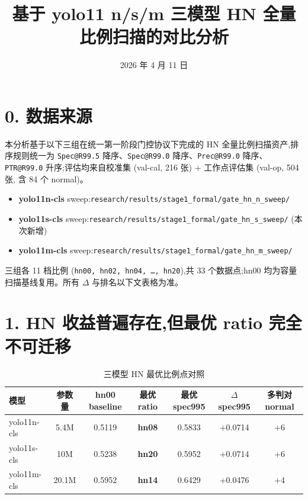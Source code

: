 \documentclass[UTF8,12pt,a4paper]{ctexart}
\title{基于 yolo11 n/s/m 三模型 HN 全量比例扫描的对比分析}
\author{}
\date{2026 年 4 月 11 日}
\begin{document}
\maketitle

\section*{0. 数据来源}

本分析基于以下三组在统一第一阶段门控协议下完成的 HN 全量比例扫描资产,排序规则统一为 \texttt{Spec@R99.5} 降序、\texttt{Spec@R99.0} 降序、\texttt{Prec@R99.0} 降序、\texttt{PTR@R99.0} 升序;评估均来自校准集 (val-cal, 216 张) + 工作点评估集 (val-op, 504 张, 含 84 个 normal)。

\begin{itemize}[leftmargin=*,itemsep=2pt]
    \item \textbf{yolo11n-cls} sweep:\texttt{research/results/stage1\_formal/gate\_hn\_n\_sweep/}
    \item \textbf{yolo11s-cls} sweep:\texttt{research/results/stage1\_formal/gate\_hn\_s\_sweep/} (本次新增)
    \item \textbf{yolo11m-cls} sweep:\texttt{research/results/stage1\_formal/gate\_hn\_m\_sweep/}
\end{itemize}

\noindent 三组各 11 档比例 (\texttt{hn00, hn02, hn04, \ldots, hn20}),共 33 个数据点;hn00 均为容量扫描基线复用。所有 \(\Delta\) 与排名以下文表格为准。

\bigskip
\section*{1. HN 收益普遍存在,但最优 ratio 完全不可迁移}

\begin{table}[h]
\centering
\caption{三模型 HN 最优比例点对照}
\begin{tabular}{lcccccc}
\toprule
模型 & 参数量 & hn00 baseline & 最优 ratio & 最优 spec995 & \(\Delta\)spec995 & 多判对 normal \\
\midrule
yolo11n-cls & 5.4M  & 0.5119 & \textbf{hn08} & 0.5833 & +0.0714 & +6 \\
yolo11s-cls & 10M   & 0.5238 & \textbf{hn20} & 0.5952 & +0.0714 & +6 \\
yolo11m-cls & 20.1M & 0.5952 & \textbf{hn14} & 0.6429 & +0.0476 & +4 \\
\bottomrule
\end{tabular}
\end{table}
\end{document}
